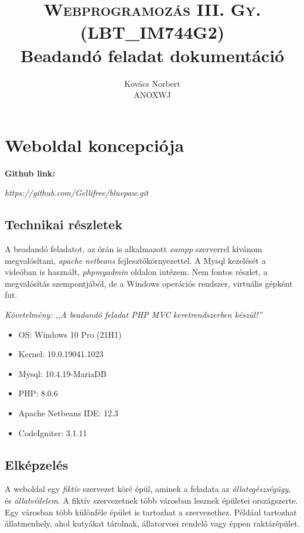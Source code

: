 \documentclass[a4paper,12pt]{article}
\begin{document}
\title{\textsc{Webprogramozás III. Gy. \\ {\normalsize (LBT\_IM744G2)}} \\ {\normalsize Beadandó feladat dokumentáció}}
\author{Kovács Norbert \\ ANOXWJ}
\maketitle
\newpage
\tableofcontents
\newpage


\section{Weboldal koncepciója}

\textbf{Github link:}
\begin{center}
\textit{	https://github.com/Gellifree/bluepaw.git}
\end{center}

\subsection{Technikai részletek}
A beadandó feladatot, az órán is alkalmazott \textit{xampp} szerverrel kívánom megvalósítani, \textit{apache netbeans} fejlesztőkörnyezettel. A Mysql kezelését a videóban is használt, \textit{phpmyadmin} oldalon intézem. Nem fontos részlet, a megvalósítás szempontjából, de a Windows operációs rendszer, virtuális gépként fut.

\begin{center}
	\textit{{\footnotesize Követelmény: ,,A beadandó feladat PHP MVC keretrendszerben készül!''}}
\end{center}

\begin{itemize}
	\item OS: Windows 10 Pro (21H1)
	\item Kernel: 10.0.19041.1023
	\item Mysql: 10.4.19-MariaDB
	\item PHP: 8.0.6
	\item Apache Netbeans IDE: 12.3
	\item CodeIgniter: 3.1.11
\end{itemize}

\subsection{Elképzelés}
A weboldal egy \textit{fiktív} szervezet köré épül, aminek a feladata  az \textit{állategészségügy}, és \textit{állatvédelem}. A fiktív szervezetnek több városban lesznek épületei országszerte. Egy városban több különféle épület is tartozhat a szervezethez. Például tartozhat állatmenhely, ahol kutyákat tárolnak, állatorvosi rendelő vagy éppen raktárépület.
\end{document}
